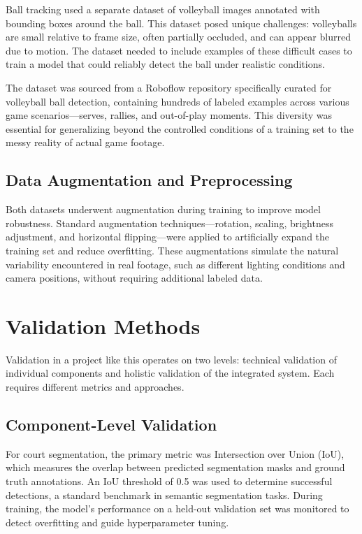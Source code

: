Ball tracking used a separate dataset of volleyball images annotated with bounding boxes around the ball. This dataset posed unique challenges: volleyballs are small relative to frame size, often partially occluded, and can appear blurred due to motion. The dataset needed to include examples of these difficult cases to train a model that could reliably detect the ball under realistic conditions.

The dataset was sourced from a Roboflow repository specifically curated for volleyball ball detection, containing hundreds of labeled examples across various game scenarios—serves, rallies, and out-of-play moments. This diversity was essential for generalizing beyond the controlled conditions of a training set to the messy reality of actual game footage.

\subsection{Data Augmentation and Preprocessing}

Both datasets underwent augmentation during training to improve model robustness. Standard augmentation techniques—rotation, scaling, brightness adjustment, and horizontal flipping—were applied to artificially expand the training set and reduce overfitting. These augmentations simulate the natural variability encountered in real footage, such as different lighting conditions and camera positions, without requiring additional labeled data.

\section{Validation Methods}

Validation in a project like this operates on two levels: technical validation of individual components and holistic validation of the integrated system. Each requires different metrics and approaches.

\subsection{Component-Level Validation}

For court segmentation, the primary metric was Intersection over Union (IoU), which measures the overlap between predicted segmentation masks and ground truth annotations. An IoU threshold of 0.5 was used to determine successful detections, a standard benchmark in semantic segmentation tasks. During training, the model's performance on a held-out validation set was monitored to detect overfitting and guide hyperparameter tuning.

